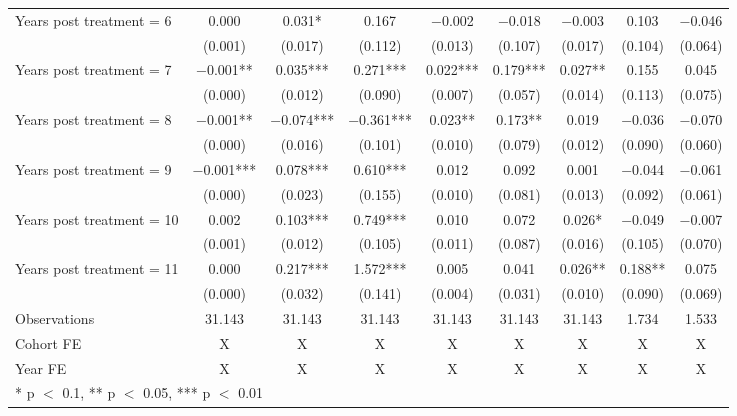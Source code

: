 \begin{table}[H]
{\begin{threeparttable}
\begin{tabular}[t]{lcccccccc}
Years post treatment = 6 & \num{ 0.000} & \num{ 0.031}* & \num{ 0.167} & \num{-0.002} & \num{-0.018} & \num{-0.003} & \num{ 0.103} & \num{-0.046}\\
 & (\num{0.001}) & (\num{0.017}) & (\num{0.112}) & (\num{0.013}) & (\num{0.107}) & (\num{0.017}) & (\num{0.104}) & (\num{0.064})\\
Years post treatment = 7 & \num{-0.001}** & \num{ 0.035}*** & \num{ 0.271}*** & \num{ 0.022}*** & \num{ 0.179}*** & \num{ 0.027}** & \num{ 0.155} & \num{ 0.045}\\
 & (\num{0.000}) & (\num{0.012}) & (\num{0.090}) & (\num{0.007}) & (\num{0.057}) & (\num{0.014}) & (\num{0.113}) & (\num{0.075})\\
Years post treatment = 8 & \num{-0.001}** & \num{-0.074}*** & \num{-0.361}*** & \num{ 0.023}** & \num{ 0.173}** & \num{ 0.019} & \num{-0.036} & \num{-0.070}\\
 & (\num{0.000}) & (\num{0.016}) & (\num{0.101}) & (\num{0.010}) & (\num{0.079}) & (\num{0.012}) & (\num{0.090}) & (\num{0.060})\\
Years post treatment = 9 & \num{-0.001}*** & \num{ 0.078}*** & \num{ 0.610}*** & \num{ 0.012} & \num{ 0.092} & \num{ 0.001} & \num{-0.044} & \num{-0.061}\\
 & (\num{0.000}) & (\num{0.023}) & (\num{0.155}) & (\num{0.010}) & (\num{0.081}) & (\num{0.013}) & (\num{0.092}) & (\num{0.061})\\
Years post treatment = 10 & \num{ 0.002} & \num{ 0.103}*** & \num{ 0.749}*** & \num{ 0.010} & \num{ 0.072} & \num{ 0.026}* & \num{-0.049} & \num{-0.007}\\
 & (\num{0.001}) & (\num{0.012}) & (\num{0.105}) & (\num{0.011}) & (\num{0.087}) & (\num{0.016}) & (\num{0.105}) & (\num{0.070})\\
Years post treatment = 11 & \num{ 0.000} & \num{ 0.217}*** & \num{ 1.572}*** & \num{ 0.005} & \num{ 0.041} & \num{ 0.026}** & \num{ 0.188}** & \num{ 0.075}\\
 & (\num{0.000}) & (\num{0.032}) & (\num{0.141}) & (\num{0.004}) & (\num{0.031}) & (\num{0.010}) & (\num{0.090}) & (\num{0.069})\\
\midrule
Observations & \num{31,143} & \num{31,143} & \num{31,143} & \num{31,143} & \num{31,143} & \num{31,143} & \num{1,734} & \num{1,533}\\
Cohort FE & X & X & X & X & X & X & X & X\\
Year FE & X & X & X & X & X & X & X & X\\
\bottomrule
\multicolumn{9}{l}{\rule{0pt}{1em}* p $<$ 0.1, ** p $<$ 0.05, *** p $<$ 0.01}\\

\end{tabular}
\end{threeparttable}}
\end{table}
